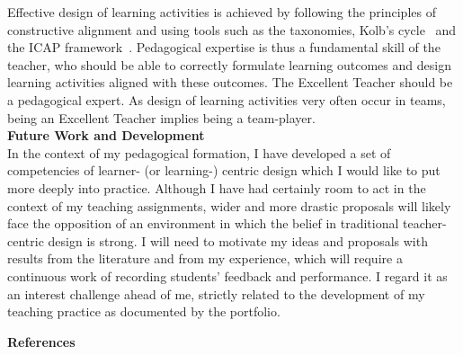 \documentclass[
  a4paper, 
]{fortysecondscv}
\begin{document}
Effective design of learning activities is achieved by following the principles of constructive alignment\cite{schuel1986,biggs2003,wadsworth2004} and using tools such as the taxonomies\cite{krathwohl1973,anderson2001,dave1975}, Kolb’s cycle~\cite{kolb1984} and the ICAP framework~\cite{chi2014}. Pedagogical expertise is thus a fundamental skill of the teacher, who should be able to correctly formulate learning outcomes and design learning activities aligned with these outcomes. The Excellent Teacher should be a pedagogical expert. As design of learning activities very often occur in teams, being an Excellent Teacher implies being a team-player.\\[6pt]
\textbf{Future Work and Development}\\[6pt]
In the context of my pedagogical formation, I have developed a set of competencies of learner- (or learning-) centric design which I would like to put more deeply into practice. Although I have had certainly room to act in the context of my teaching assignments, wider and more drastic proposals will likely face the opposition of an environment in which the belief in traditional teacher-centric design is strong. I will need to motivate my ideas and proposals with results from the literature and from my experience, which will require a continuous work of recording students’ feedback and performance. I regard it as an interest challenge ahead of me, strictly related to the development of my teaching practice as documented by the portfolio.\\[6pt]

\newpage
\makebacksidebar
\hrulefill\hspace{5pt}\textbf{\thepage}

\textbf{References}
\end{document}
